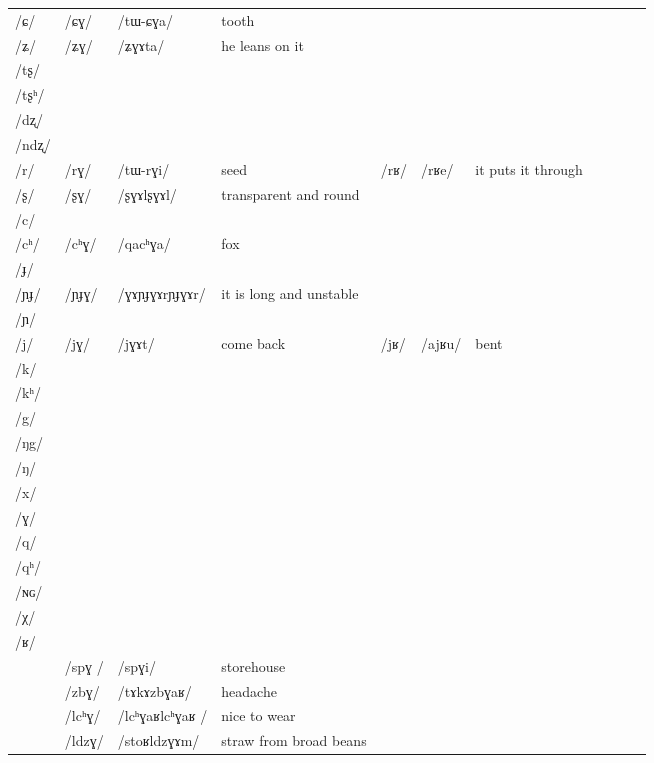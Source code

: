 \documentclass[oldfontcommands,oneside,a4paper,11pt]{article}
\newcommand{\ipa}[1]{/#1/} %
\newcommand{\idph}[1]{\cellcolor{gray}\textbf{#1}}
\begin{document}
\begin{table}
{\begin{tabular}{l|lll|lll|lll|l}
\ipa{ɕ}  &  	\ipa{ɕɣ}  &  	\ipa{tɯ-ɕɣa}  &  tooth	&	&	& \\
\ipa{ʑ}  &  	\ipa{ʑɣ}  &  	\ipa{ʑɣɤta}  & he leans on it 	&	&	& \\
\ipa{tʂ}  &  	  &  	  &  	&	&	& \\
\ipa{tʂʰ}  &  	  &  	  &  	&	&	& \\
\ipa{dʐ}  &  	  &  	  &  	&	&	& \\
\ipa{ndʐ}  &  	  &  	  &  	&	&	& \\
\ipa{r}  &  	\ipa{rɣ}  &  	\ipa{tɯ-rɣi}  &  seed	&\ipa{rʁ}	&\ipa{rʁe}& it puts it through\\
\ipa{ʂ}  &  	\ipa{ʂɣ} \idph{} &  	\ipa{ʂɣɤlʂɣɤl}  & transparent and round	&	&	& \\
\ipa{c}  &  	  &  	  &  	&	&	& \\
\ipa{cʰ}  &  	\ipa{cʰɣ}  &  	\ipa{qacʰɣa}  &fox  	&	&	& \\
\ipa{ɟ}  &  	  &  	  &  	&	&	& \\
\ipa{ɲɟ}  &  	\ipa{ɲɟɣ} \idph{} &  	\ipa{ɣɤɲɟɣɤrɲɟɣɤr}  &  it is long and unstable	&	&	& \\
\ipa{ɲ}  &  	  &  	  &  	&	&	& \\
\ipa{j}  &  	\ipa{jɣ}  &  	\ipa{jɣɤt}  &come back  	&\ipa{jʁ}	&\ipa{ajʁu}	&bent \\
\ipa{k}  &  	  &  	  &  	&	&	& \\
\ipa{kʰ}  &  	  &  	  &  	&	&	& \\
\ipa{g}  &  	  &  	  &  	&	&	& \\
\ipa{ŋg}  &  	  &  	  &  	&	&	& \\
\ipa{ŋ}  &  	  &  	  &  	&	&	& \\
\ipa{x}  &  	  &  	  &  	&	&	& \\
\ipa{ɣ}  &  	  &  	  &  	&	&	& \\
\ipa{q}  &  	  &  	  &  	&	&	& \\
\ipa{qʰ}  &  	  &  	  &  	&	&	& \\
\ipa{ɴɢ}  &  	  &  	  &  	&	&	& \\
\ipa{χ}  &  	  &  	  &  	&	&	& \\
\ipa{ʁ}  &  	  &  	  &  	&	&	& \\
\midrule
&	\ipa{spɣ }  &	\ipa{spɣi}  &storehouse	&&&\\	
&	\ipa{zbɣ}  &	\ipa{tɤkɤzbɣaʁ}  &headache	&&&\\	
\midrule
&	\ipa{lcʰɣ} \idph{} &	\ipa{lcʰɣaʁlcʰɣaʁ }  &	nice to wear&&&\\	
&	\ipa{ldzɣ}  &	\ipa{stoʁldzɣɤm}  &	straw from broad beans &&&\\	

\end{tabular}}
\end{table}
\end{document}
